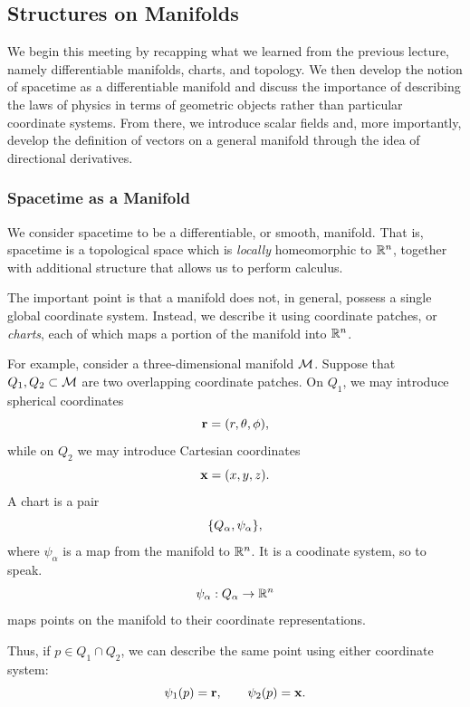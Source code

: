 
\subsection{Structures on Manifolds}

	We begin this meeting by recapping what we learned from the previous
	lecture, namely differentiable manifolds, charts, and topology. We then
	develop the notion of spacetime as a differentiable manifold and discuss
	the importance of describing the laws of physics in terms of geometric 
	objects rather than particular coordinate systems. From there, we introduce
	scalar fields and, more importantly, develop the definition of vectors on a
	general manifold through the idea of directional derivatives. 

	\subsubsection{Spacetime as a Manifold}
		We consider spacetime to be a differentiable, or smooth, manifold.
		That is, spacetime is a topological space which is \textit{locally}
		homeomorphic to $\mathbb{R}^n$, together with additional structure that allows
		us to perform calculus.

		The important point is that a manifold does not, in general, possess
		a single global coordinate system. Instead, we describe it using
		coordinate patches, or \textit{charts}, each of which maps a portion
		of the manifold into $\mathbb{R}^n$.

		For example, consider a three-dimensional manifold $\mathcal{M}$.
		Suppose that $Q_1,Q_2\subset\mathcal{M}$ are two overlapping coordinate
		patches. On $Q_1$, we may introduce spherical coordinates
		\[
			\vb{r}=(r,\theta,\phi),
		\]
		while on $Q_2$ we may introduce Cartesian coordinates
		\[
			\vb{x}=(x,y,z).
		\]
		A chart is a pair
		\[
			\qty{Q_\alpha,\psi_\alpha},
		\]
		where $\psi_\alpha$ is a map from the manifold to $\mathbb{R}^n$. It is a coodinate system, so to speak.
		\[
			\psi_\alpha:Q_\alpha\to\mathbb{R}^n
		\]
		maps points on the manifold to their coordinate representations.

		Thus, if $p\in Q_1\cap Q_2$, we can describe the same point using
		either coordinate system:
		\[
			\psi_1(p)=\vb{r},
			\qquad
			\psi_2(p)=\vb{x}.
		\]

